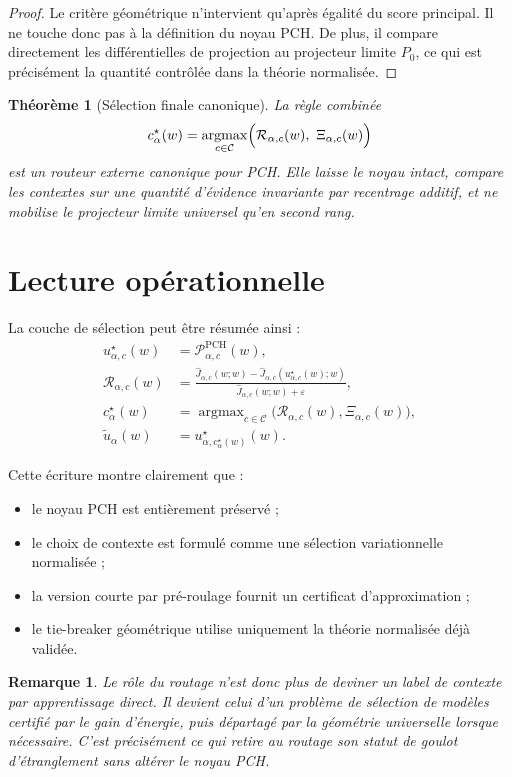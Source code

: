 \documentclass[11pt,a4paper]{article}
\newtheorem{theorem}{Théorème}[section]
\newtheorem{remark}{Remarque}[section]
\DeclareMathOperator{\argmax}{argmax}
\newcommand{\Ccal}{\mathcal C}
\newcommand{\Pcal}{\mathcal P}
\begin{document}
\begin{proof}
Le critère géométrique n'intervient qu'après égalité du score principal.
Il ne touche donc pas à la définition du noyau PCH.
De plus, il compare directement les différentielles de projection au projecteur limite \(P_0\), ce qui est précisément la quantité contrôlée dans la théorie normalisée.
\end{proof}

\begin{theorem}[Sélection finale canonique]
La règle combinée
\[
c^\star_\alpha(w)
=
\argmax_{c\in\Ccal}
\Bigl(\mathcal R_{\alpha,c}(w),\ \Xi_{\alpha,c}(w)\Bigr)
\]
est un routeur externe canonique pour PCH.
Elle laisse le noyau intact, compare les contextes sur une quantité d'évidence invariante par recentrage additif, et ne mobilise le projecteur limite universel qu'en second rang.
\end{theorem}

\section{Lecture opérationnelle}

La couche de sélection peut être résumée ainsi :
\[
\boxed{
\begin{aligned}
u^\star_{\alpha,c}(w)&=\Pcal^{\mathrm{PCH}}_{\alpha,c}(w),\\[0.2em]
\mathcal R_{\alpha,c}(w)&=
\frac{
\widehat J_{\alpha,c}(w;w)
-
\widehat J_{\alpha,c}(u^\star_{\alpha,c}(w);w)
}{
\widehat J_{\alpha,c}(w;w)+\varepsilon
},\\[0.2em]
c^\star_\alpha(w)&=\argmax_{c\in\Ccal}
\bigl(\mathcal R_{\alpha,c}(w),\Xi_{\alpha,c}(w)\bigr),\\[0.2em]
\widetilde u_\alpha(w)&=u^\star_{\alpha,c^\star_\alpha(w)}(w).
\end{aligned}
}
\]

Cette écriture montre clairement que :
\begin{itemize}[leftmargin=2em]
\item le noyau PCH est entièrement préservé ;
\item le choix de contexte est formulé comme une sélection variationnelle normalisée ;
\item la version courte par pré-roulage fournit un certificat d'approximation ;
\item le tie-breaker géométrique utilise uniquement la théorie normalisée déjà validée.
\end{itemize}

\begin{remark}
Le rôle du routage n'est donc plus de deviner un label de contexte par apprentissage direct.
Il devient celui d'un problème de sélection de modèles certifié par le gain d'énergie, puis départagé par la géométrie universelle lorsque nécessaire.
C'est précisément ce qui retire au routage son statut de goulot d'étranglement sans altérer le noyau PCH.
\end{remark}
\end{document}
